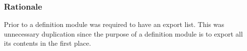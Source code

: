 \documentclass[10pt,a4paper]{article} %
\begin{document}
\subsubsection{Rationale}
Prior to \cite{Wirth85} a definition module was required to have an export list. This was unnecessary duplication since the purpose of a definition module is to export all its contents in the first place. 



\printglossary[title=Definitions, toctitle=Definitions]




\end{document}
